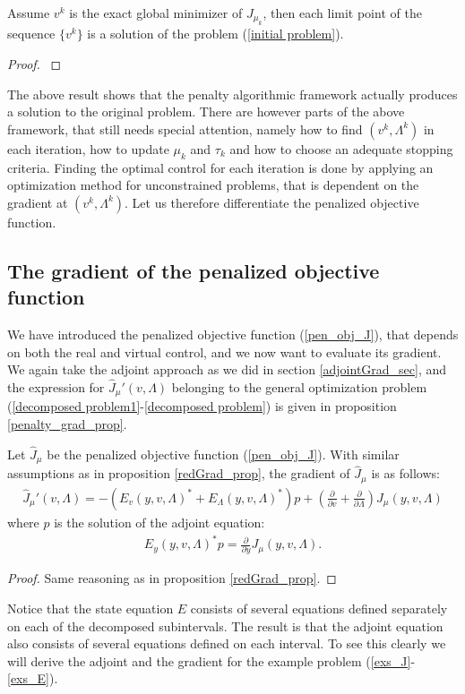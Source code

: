 \begin{theorem}
Assume $v^k$ is the exact global minimizer of $J_{\mu_k}$, then each limit point of the sequence $\{v^k\}$ is a solution of the problem (\ref{initial problem}).
\end{theorem}
\begin{proof}
\cite{nocedal2006numerical}
\end{proof}
\noindent
The above result shows that the penalty algorithmic framework actually produces a solution to the original problem. There are however parts of the above framework, that still needs special attention, namely how to find $(v^k,\Lambda^k)$ in each iteration, how to update $\mu_k$ and $\tau_k$ and how to choose an adequate stopping criteria. Finding the optimal control for each iteration is done by applying an optimization method for unconstrained problems, that is dependent on the gradient at $(v^k,\Lambda^k)$. Let us therefore differentiate the penalized objective function.
\subsection{The gradient of the penalized objective function}
We have introduced the penalized objective function (\ref{pen_obj_J}), that depends on both the real and virtual control, and we now want to evaluate its gradient. We again take the adjoint approach as we did in section \ref{adjointGrad_sec}, and the expression for $\hat J_{\mu}'(v,\Lambda)$ belonging to the general optimization problem (\ref{decomposed problem1}-\ref{decomposed problem}) is given in proposition \ref{penalty_grad_prop}.
\begin{proposition} \label{penalty_grad_prop}
Let $\hat J_{\mu}$ be the penalized objective function (\ref{pen_obj_J}). With similar assumptions as in proposition \ref{redGrad_prop}, the gradient of $\hat J_{\mu}$ is as follows: 
\begin{align}
\hat J_{\mu}'(v,\Lambda)=-(E_v(y,v,\Lambda)^*+E_{\Lambda}(y,v,\Lambda)^*)p+ (\frac{\partial}{\partial v}+\frac{\partial}{\partial\Lambda})J_{\mu}(y,v,\Lambda) \label{pen_abs_grad}
\end{align}
where $p$ is the solution of the adjoint equation:
\begin{align}
E_y(y,v,\Lambda)^{*}p=\frac{\partial}{\partial y}J_{\mu}(y,v,\Lambda). \label{penalty adjoint}
\end{align}
\end{proposition}
\begin{proof}
Same reasoning as in proposition \ref{redGrad_prop}.
\end{proof}
\noindent
Notice that the state equation $E$ consists of several equations defined separately on each of the decomposed subintervals. The result is that the adjoint equation also consists of several equations defined on each interval. To see this clearly we will derive the adjoint and the gradient for the example problem (\ref{exs_J}-\ref{exs_E}).
